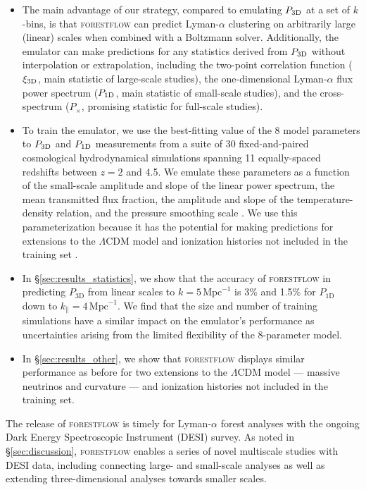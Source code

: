 \documentclass[longauth]{aa}
\newcommand{\lya}{Lyman-$\alpha$\xspace}
\newcommand{\lyaf}{Lyman-$\alpha$ forest\xspace}
\newcommand{\pcross}{$P_{\times}$\xspace}
\newcommand{\poned}{\ensuremath{P_{\rm 1D}}\xspace}
\newcommand{\xithreed}{\ensuremath{\xi_{\rm 3D}}\xspace}
\newcommand{\pthreed}{\ensuremath{P_{\rm 3D}}\xspace}
\newcommand{\forestflow}{\textsc{forestflow}\xspace}
\newcommand{\iMpc}{\ensuremath{\,\mathrm{Mpc}^{-1}}}
\begin{document}
\begin{itemize}
    \item The main advantage of our strategy, compared to emulating \pthreed at a set of $k$-bins, is that \forestflow can predict \lya clustering on arbitrarily large (linear) scales when combined with a Boltzmann solver. Additionally, the emulator can make predictions for any statistics derived from \pthreed without interpolation or extrapolation, including the two-point correlation function (\xithreed, main statistic of large-scale studies), the one-dimensional \lya flux power spectrum (\poned, main statistic of small-scale studies), and the cross-spectrum (\pcross, promising statistic for full-scale studies).

    \item To train the emulator, we use the best-fitting value of the 8 model parameters to \pthreed and \poned measurements from a suite of 30 fixed-and-paired cosmological hydrodynamical simulations spanning 11 equally-spaced redshifts between $z=2$ and 4.5. We emulate these parameters as a function of the small-scale amplitude and slope of the linear power spectrum, the mean transmitted flux fraction, the amplitude and slope of the temperature-density relation, and the pressure smoothing scale \citep[see][]{Pedersen2021}. We use this parameterization because it has the potential for making predictions for extensions to the $\Lambda$CDM model and ionization histories not included in the training set \citep[][]{ pedersen2023CompressingCosmologicalInformation, cabayol-garcia2023NeuralNetworkEmulator}. 

    \item In \S\ref{sec:results_statistics}, we show that the accuracy of \textsc{forestflow} in predicting $P_\mathrm{3D}$ from linear scales to $k=5\iMpc$ is 3\% and 1.5\% for $P_\mathrm{1D}$ down to $k_\parallel=4\iMpc$. We find that the size and number of training simulations have a similar impact on the emulator's performance as uncertainties arising from the limited flexibility of the 8-parameter model. 

    \item In \S\ref{sec:results_other}, we show that \forestflow displays similar performance as before for two extensions to the $\Lambda$CDM model --- massive neutrinos and curvature --- and ionization histories not included in the training set. 
\end{itemize}

The release of \forestflow is timely for \lyaf analyses with the ongoing Dark Energy Spectroscopic Instrument (DESI) survey. As noted in \S\ref{sec:discussion}, \forestflow enables a series of novel multiscale studies with DESI data, including connecting large- and small-scale analyses as well as extending three-dimensional analyses towards smaller scales.
\end{document}
